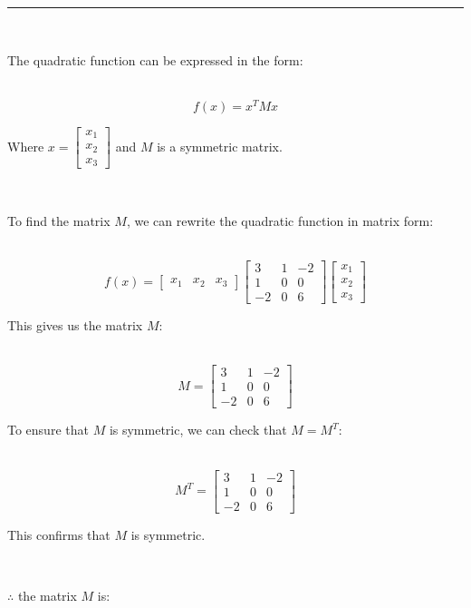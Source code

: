\documentclass{article}
\begin{document}
\noindent\rule{\textwidth}{0.4pt}\\

\parbox{\textwidth}{The quadratic function can be expressed in the form:}\\

$$f(x) = x^TMx$$

\parbox{\textwidth}{Where $x = \begin{bmatrix} x_1 \\ x_2 \\ x_3 \end{bmatrix}$ and $M$ is a symmetric matrix.}\\

\parbox{\textwidth}{To find the matrix $M$, we can rewrite the quadratic function in matrix form:}\\

$$f(x) = \begin{bmatrix} x_1 & x_2 & x_3 \end{bmatrix} \begin{bmatrix} 3 & 1 & -2 \\ 1 & 0 & 0 \\ -2 & 0 & 6 \end{bmatrix} \begin{bmatrix} x_1 \\ x_2 \\ x_3 \end{bmatrix}$$

\parbox{\textwidth}{This gives us the matrix $M$:}\\

$$M = \begin{bmatrix} 3 & 1 & -2 \\ 1 & 0 & 0 \\ -2 & 0 & 6 \end{bmatrix}$$

\parbox{\textwidth}{To ensure that $M$ is symmetric, we can check that $M = M^T$:}\\

$$M^T = \begin{bmatrix} 3 & 1 & -2 \\ 1 & 0 & 0 \\ -2 & 0 & 6 \end{bmatrix}$$

\parbox{\textwidth}{This confirms that $M$ is symmetric.}\\

\parbox{\textwidth}{$\therefore$ the matrix $M$ is:}\\
\end{document}
